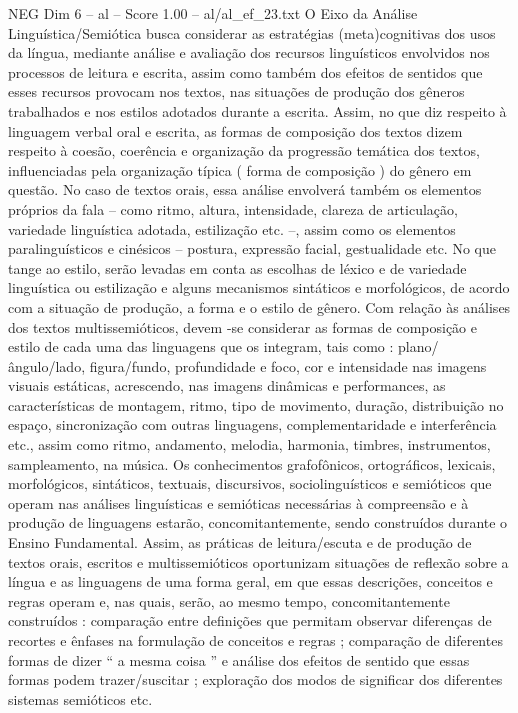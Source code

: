 \begin{textsample}{NEG Dim 6 – al – Score 1.00 – al/al\_ef\_23.txt}  \label{ex:f6_neg_070}
O Eixo da Análise Linguística/Semiótica busca considerar as estratégias (meta)cognitivas dos usos da língua, mediante análise e avaliação dos recursos linguísticos envolvidos nos processos de leitura e escrita, assim como também dos efeitos de sentidos que esses recursos provocam nos textos, nas situações de produção dos gêneros trabalhados e nos estilos adotados durante a escrita.
Assim, no que diz respeito à linguagem verbal oral e escrita, as formas de composição dos textos dizem respeito à coesão, coerência e organização da progressão temática dos textos, influenciadas pela organização típica ( forma de composição ) do gênero em questão.
No caso de textos orais, essa análise envolverá também os elementos próprios da fala – como ritmo, altura, intensidade, clareza de articulação, variedade linguística adotada, estilização etc. –, assim como os elementos paralinguísticos e cinésicos – postura, expressão facial, gestualidade etc.
No que tange ao estilo, serão levadas em conta as escolhas de léxico e de variedade linguística ou estilização e alguns mecanismos sintáticos e morfológicos, de acordo com a situação de produção, a forma e o estilo de gênero.
Com relação às análises dos textos multissemióticos, devem -se considerar as formas de composição e estilo de cada uma das linguagens que os integram, tais como : plano/ângulo/lado, figura/fundo, profundidade e foco, cor e intensidade nas imagens visuais estáticas, acrescendo, nas imagens dinâmicas e performances, as características de montagem, ritmo, tipo de movimento, duração, distribuição no espaço, sincronização com outras linguagens, complementaridade e interferência etc., assim como ritmo, andamento, melodia, harmonia, timbres, instrumentos, sampleamento, na música.
Os conhecimentos grafofônicos, ortográficos, lexicais, morfológicos, sintáticos, textuais, discursivos, sociolinguísticos e semióticos que operam nas análises linguísticas e semióticas necessárias à compreensão e à produção de linguagens estarão, concomitantemente, sendo construídos durante o Ensino Fundamental.
Assim, as práticas de leitura/escuta e de produção de textos orais, escritos e multissemióticos oportunizam situações de reflexão sobre a língua e as linguagens de uma forma geral, em que essas descrições, conceitos e regras operam e, nas quais, serão, ao mesmo tempo, concomitantemente construídos : comparação entre definições que permitam observar diferenças de recortes e ênfases na formulação de conceitos e regras ; comparação de diferentes formas de dizer “ a mesma coisa ” e análise dos efeitos de sentido que essas formas podem trazer/suscitar ; exploração dos modos de significar dos diferentes sistemas semióticos etc.

\end{textsample}
